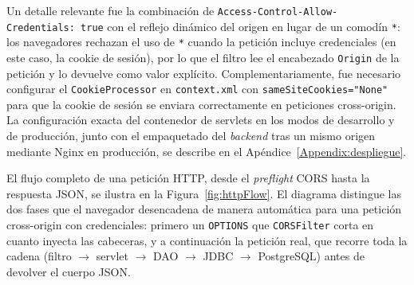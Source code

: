\begin{sloppypar}
Un detalle relevante fue la combinación de
\texttt{Access-\allowbreak Control-\allowbreak Allow-\allowbreak Credentials:~true}
con el reflejo dinámico del origen en lugar de un comodín \texttt{*}: los navegadores
rechazan el uso de \texttt{*} cuando la petición incluye credenciales (en este caso,
la cookie de sesión), por lo que el filtro lee el encabezado \texttt{Origin} de la
petición y lo devuelve como valor explícito. Complementariamente, fue necesario
configurar el \texttt{CookieProcessor} en \texttt{context.xml} con
\texttt{sameSiteCookies="None"} para que la cookie de sesión se enviara correctamente
en peticiones cross-origin. La configuración exacta del contenedor de
servlets en los modos de desarrollo y de producción, junto con el
empaquetado del \textit{backend} tras un mismo origen mediante Nginx en
producción, se describe en el Apéndice~\ref{Appendix:despliegue}.
\end{sloppypar}

El flujo completo de una petición HTTP, desde el \textit{preflight}
CORS hasta la respuesta JSON, se ilustra en la
Figura~\ref{fig:httpFlow}. El diagrama distingue las dos fases que el
navegador desencadena de manera automática para una petición
cross-origin con credenciales: primero un \texttt{OPTIONS} que
\texttt{CORSFilter} corta en cuanto inyecta las cabeceras, y a
continuación la petición real, que recorre toda la cadena
(filtro $\to$ servlet $\to$ DAO $\to$ JDBC $\to$ PostgreSQL) antes de
devolver el cuerpo JSON.

